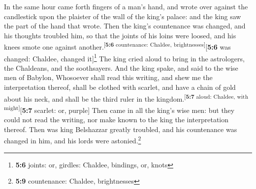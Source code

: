  In the same hour came forth fingers of a man's hand, and
wrote over against the candlestick upon the plaister of the wall of the
king's palace: and the king saw the part of the hand that wrote.
 Then the king's countenance was changed, and his thoughts
troubled him, so that the joints of his loins were loosed, and his knees
smote one against another.\textsuperscript{{[}\textbf{5:6} countenance:
Chaldee, brightnesses{]}}{[}\textbf{5:6} was changed: Chaldee, changed
it{]}\footnote{\textbf{5:6} joints: or, girdles: Chaldee, bindings, or,
  knots}  The king cried aloud to bring in the
astrologers, the Chaldeans, and the soothsayers. And the king spake, and
said to the wise men of Babylon, Whosoever shall read this writing, and
shew me the interpretation thereof, shall be clothed with scarlet, and
have a chain of gold about his neck, and shall be the third ruler in the
kingdom.\textsuperscript{{[}\textbf{5:7} aloud: Chaldee, with
might{]}}{[}\textbf{5:7} scarlet: or, purple{]}  Then came
in all the king's wise men: but they could not read the writing, nor
make known to the king the interpretation thereof.  Then
was king Belshazzar greatly troubled, and his countenance was changed in
him, and his lords were astonied.\footnote{\textbf{5:9} countenance:
  Chaldee, brightnesses}


